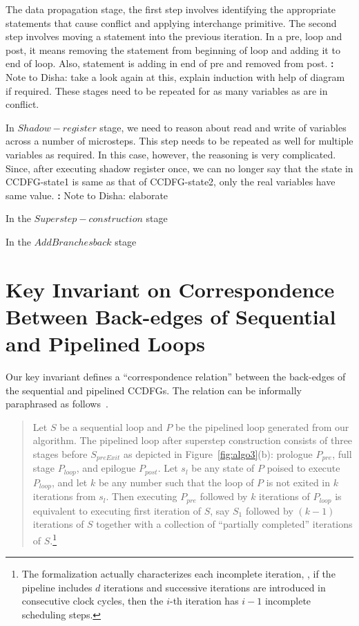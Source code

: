 The data propagation stage, the first step involves identifying the appropriate statements that cause conflict 
and applying interchange primitive. The second step involves moving a statement into the previous iteration. In a pre, loop and post,
it means removing the statement from beginning of loop and adding it to end of loop. Also, statement is adding in end of pre and removed 
from post. {\textbf: Note to Disha: take a look again at this, explain induction with help of diagram if required}.  These stages need to be
repeated for as many variables as are in conflict. 

In $Shadow-register$ stage, we need to reason about read and write of variables across a number of microsteps. This step needs to be repeated as well for
multiple variables as required. In this case, however, the reasoning is very complicated. Since, after executing shadow register once, we can no longer say that the state in CCDFG-state1 is same as that of CCDFG-state2, only the real variables have same value. {\textbf: Note to Disha:  elaborate}

In the $Superstep-construction$ stage

In the $AddBranches back$ stage


\section{Key Invariant on Correspondence Between Back-edges of Sequential and Pipelined Loops}
 Our key invariant defines a ``correspondence relation''
between the back-edges of the sequential and pipelined CCDFGs.
The relation can be informally paraphrased as
follows~\cite{disha-itp14}.

\begin{quote}
Let $S$ be a sequential loop and $P$ be the pipelined loop
generated from our algorithm. The pipelined loop after superstep construction
consists of
three stages before $S_{preExit}$ as depicted in
Figure~\ref{fig:algo3}(b): prologue $P_{pre}$, full stage
$P_{loop}$, and epilogue $P_{post}$.  Let $s_l$ be any state of $P$
poised to execute $P_{loop}$, and let $k$ be any number such that
the loop of $P$ is not exited in $k$ iterations from $s_l$.
Then executing $P_{pre}$ followed by $k$ iterations of $P_{loop}$ is
equivalent to executing first iteration of $S$, say $S_1$
followed by $(k - 1)$ iterations of $S$ together with a
collection of ``partially completed'' iterations of
$S$.\footnote{The formalization actually characterizes each
  incomplete iteration, \eg, if the pipeline includes $d$
  iterations and successive iterations are introduced in
  consecutive clock cycles, then the $i$-th iteration has $i
  - 1$ incomplete scheduling steps.}
\end{quote}

